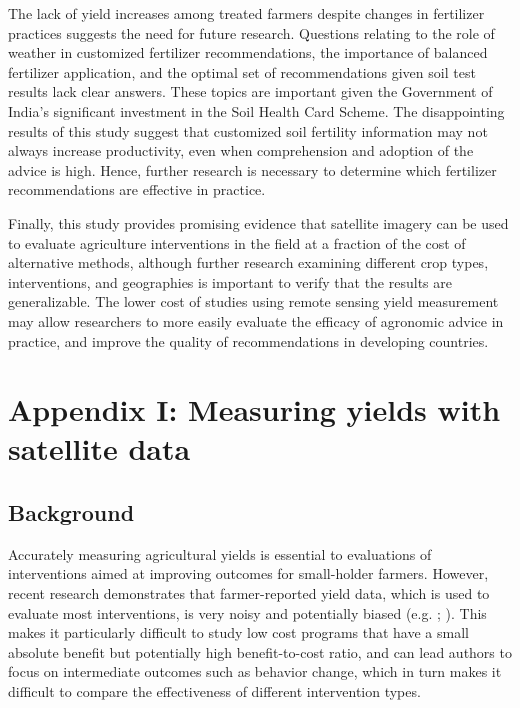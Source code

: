 \documentclass{article}
\begin{document}
The lack of yield increases among treated farmers despite changes in fertilizer practices suggests the need for future research. Questions relating to the role of weather in customized fertilizer recommendations, the importance of balanced fertilizer application, and the optimal set of recommendations given soil test results lack clear answers. These topics are important given the Government of India’s significant investment in the Soil Health Card Scheme. The disappointing results of this study suggest that customized soil fertility information may not always increase productivity, even when comprehension and adoption of the advice is high. Hence, further research is necessary to determine which fertilizer recommendations are effective in practice. 

Finally, this study provides promising evidence that satellite imagery can be used to evaluate agriculture interventions in the field at a fraction of the cost of alternative methods, although further research examining different crop types, interventions, and geographies is important to verify that the results are generalizable. The lower cost of studies using remote sensing yield measurement may allow researchers to more easily evaluate the efficacy of agronomic advice in practice, and improve the quality of recommendations in developing countries.

\clearpage
\pagebreak

\section{Appendix I: Measuring yields with satellite data} \label{appendix-1}

\subsection{Background}

Accurately measuring agricultural yields is essential to evaluations of interventions aimed at improving outcomes for small-holder farmers. However, recent research demonstrates that farmer-reported yield data, which is used to evaluate most interventions, is very noisy and potentially biased (e.g. \citet{Carletto2015FromPolicies}; \citet{Lobell2019EyesAnalysis}). This makes it particularly difficult to study low cost programs that have a small absolute benefit but potentially high benefit-to-cost ratio, and can lead authors to focus on intermediate outcomes such as behavior change, which in turn makes it difficult to compare the effectiveness of different intervention types.
\end{document}
